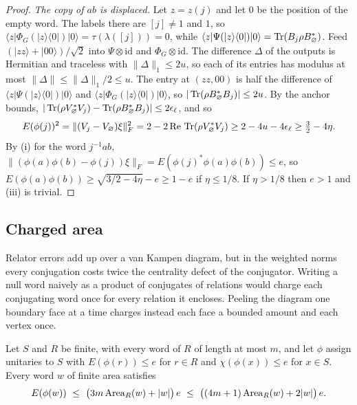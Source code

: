 \begin{proof}
\emph{The copy of $ab$ is displaced.} Let $z=z(j)$ and let $0$ be the position of the empty word. The labels there are $[j]\ne1$ and $1$, so
$\langle z|\Phi_G(|z\rangle\langle0|)|0\rangle=\tau(\lambda([j]))=0$, while $\langle z|\Psi(|z\rangle\langle0|)|0\rangle=\operatorname{Tr}(B_j\rho B_\varnothing^*)$. Feed
$(|zz\rangle+|00\rangle)/\sqrt2$ into $\Psi\otimes\mathrm{id}$ and $\Phi_G\otimes\mathrm{id}$. The difference $\Delta$ of the outputs is Hermitian and
traceless with $\|\Delta\|_1\le2u$, so each of its entries has modulus at most $\|\Delta\|\le\|\Delta\|_1/2\le u$. The entry at $(zz,00)$ is half the
difference of $\langle z|\Psi(|z\rangle\langle0|)|0\rangle$ and $\langle z|\Phi_G(|z\rangle\langle0|)|0\rangle$, so $|\operatorname{Tr}(\rho B_\varnothing^*B_j)|\le2u$. By the
anchor bounds, $|\operatorname{Tr}(\rho V_\varnothing^*V_j)-\operatorname{Tr}(\rho B_\varnothing^*B_j)|\le2\epsilon_\ell$, and so
\[
E(\phi(j))^2=\|(V_j-V_\varnothing)\xi\|_F^2=2-2\,\mathrm{Re}\,\operatorname{Tr}(\rho V_\varnothing^*V_j)\ge2-4u-4\epsilon_\ell\ge\tfrac32-4\eta .
\]
By (i) for the word $j^{-1}ab$, $\|(\phi(a)\phi(b)-\phi(j))\xi\|_F=E(\phi(j)^*\phi(a)\phi(b))\le e$, so $E(\phi(a)\phi(b))\ge\sqrt{3/2-4\eta}-e\ge1-e$ if
$\eta\le1/8$. If $\eta>1/8$ then $e>1$ and (iii) is trivial.
\end{proof}

\subsection{Charged area}

Relator errors add up over a van Kampen diagram, but in the weighted norms every conjugation costs twice the centrality defect of the
conjugator. Writing a null word naively as a product of conjugates of relations would charge each conjugating word once for every relation it
encloses. Peeling the diagram one boundary face at a time charges instead each face a bounded amount and each vertex once.

\begin{lemma}\label{lem:charged-area}
Let $S$ and $R$ be finite, with every word of $R$ of length at most $m$, and let $\phi$ assign unitaries to $S$ with $E(\phi(r))\le e$ for $r\in R$
and $\chi(\phi(x))\le e$ for $x\in S$. Every word $w$ of finite area satisfies
\[
E(\phi(w))\ \le\ \bigl(3m\Area_R(w)+|w|\bigr)\,e\ \le\ \bigl((4m+1)\Area_R(w)+2|w|\bigr)\,e .
\]
\end{lemma}

